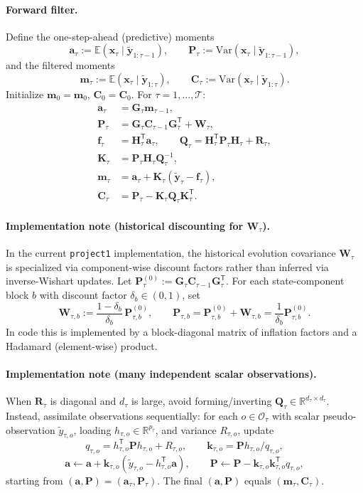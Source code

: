 \documentclass[11pt]{article}
\newcommand{\R}{\mathbb{R}}
\newcommand{\1}{\mathbb{I}}
\newcommand{\T}{\mathsf{T}}
\newcommand{\E}{\mathbb{E}}
\newcommand{\Var}{\mathrm{Var}}
\begin{document}
\paragraph{Forward filter.}
Define the one-step-ahead (predictive) moments
\[
\bm a_\tau := \E(\bm x_\tau\mid \tilde{\bm y}_{1:\tau-1}), \qquad
\bm P_\tau := \Var(\bm x_\tau\mid \tilde{\bm y}_{1:\tau-1}),
\]
and the filtered moments
\[
\bm m_\tau := \E(\bm x_\tau\mid \tilde{\bm y}_{1:\tau}), \qquad
\bm C_\tau := \Var(\bm x_\tau\mid \tilde{\bm y}_{1:\tau}).
\]
Initialize $\bm m_0=\bm m_0$, $\bm C_0=\bm C_0$. For $\tau=1,\dots,\mathcal{T}$:
\begin{align}
\bm a_\tau &= \bm G_\tau \bm m_{\tau-1}, \label{eq:kf_pred_mean}\\
\bm P_\tau &= \bm G_\tau \bm C_{\tau-1}\bm G_\tau^\T + \bm W_\tau, \label{eq:kf_pred_cov}\\
\bm f_\tau &= \bm H_\tau^\T \bm a_\tau,\qquad
\bm Q_\tau = \bm H_\tau^\T \bm P_\tau \bm H_\tau + \bm R_\tau, \label{eq:kf_forecast}\\
\bm K_\tau &= \bm P_\tau \bm H_\tau \bm Q_\tau^{-1}, \label{eq:kf_gain}\\
\bm m_\tau &= \bm a_\tau + \bm K_\tau(\tilde{\bm y}_\tau-\bm f_\tau), \label{eq:kf_filt_mean}\\
\bm C_\tau &= \bm P_\tau - \bm K_\tau \bm Q_\tau \bm K_\tau^\T. \label{eq:kf_filt_cov}
\end{align}

\paragraph{Implementation note (historical discounting for $\bm W_\tau$).}
In the current \texttt{project1} implementation, the historical evolution covariance $\bm W_\tau$ is specialized via
component-wise discount factors rather than inferred via inverse-Wishart updates.
Let $\bm P_\tau^{(0)}:=\bm G_\tau \bm C_{\tau-1}\bm G_\tau^\T$.
For each state-component block $b$ with discount factor $\delta_b\in(0,1)$, set
\[
\bm W_{\tau,b}:=\frac{1-\delta_b}{\delta_b}\,\bm P_{\tau,b}^{(0)},
\qquad
\bm P_{\tau,b}=\bm P_{\tau,b}^{(0)}+\bm W_{\tau,b}=\frac{1}{\delta_b}\bm P_{\tau,b}^{(0)}.
\]
In code this is implemented by a block-diagonal matrix of inflation factors and a Hadamard (element-wise) product.

\paragraph{Implementation note (many independent scalar observations).}
When $\bm R_\tau$ is diagonal and $d_\tau$ is large, avoid forming/inverting $\bm Q_\tau\in\R^{d_\tau\times d_\tau}$.
Instead, assimilate observations sequentially:
for each $o\in\mathcal{O}_\tau$ with scalar pseudo-observation $\tilde y_{\tau,o}$, loading $h_{\tau,o}\in\R^{p_\tau}$,
and variance $R_{\tau,o}$, update
\[
q_{\tau,o}=h_{\tau,o}^\T \bm P h_{\tau,o}+R_{\tau,o},\qquad
\bm k_{\tau,o}=\bm P h_{\tau,o}/q_{\tau,o},
\]
\[
\bm a\leftarrow \bm a+\bm k_{\tau,o}(\tilde y_{\tau,o}-h_{\tau,o}^\T \bm a),\qquad
\bm P\leftarrow \bm P-\bm k_{\tau,o}\bm k_{\tau,o}^\T q_{\tau,o},
\]
starting from $(\bm a,\bm P)=(\bm a_\tau,\bm P_\tau)$. The final $(\bm a,\bm P)$ equals $(\bm m_\tau,\bm C_\tau)$.
\end{document}
